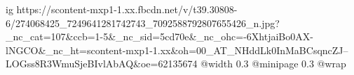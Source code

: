  
 
 
 
 

\ifcmt
  ig https://scontent-mxp1-1.xx.fbcdn.net/v/t39.30808-6/274068425_7249641281742743_7092588792807655426_n.jpg?_nc_cat=107&ccb=1-5&_nc_sid=5cd70e&_nc_ohc=-6XhtjaiBo0AX-lNGCO&_nc_ht=scontent-mxp1-1.xx&oh=00_AT_NHddLk0InMaBCsqncZJ--LOGss8R3WmuSjeBIvlAbAQ&oe=62135674
  @width 0.3
  @minipage 0.3
  @wrap \parpic[r]
\fi
